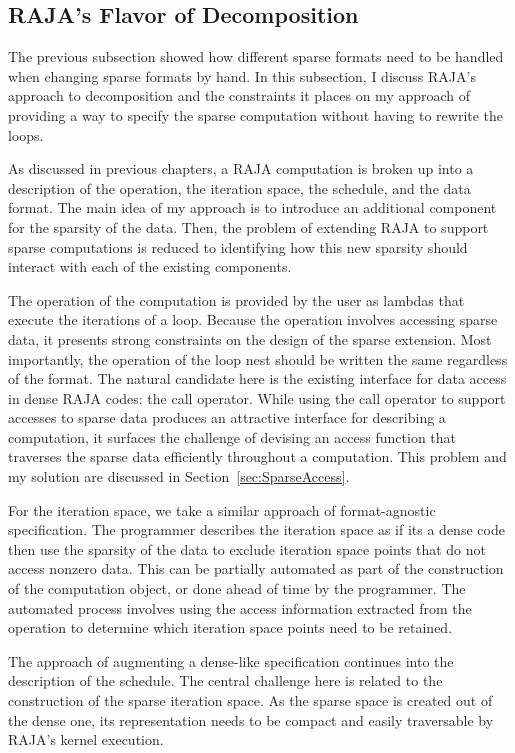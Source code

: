 \subsection{RAJA's Flavor of Decomposition}
The previous subsection showed how different sparse formats need to be handled when changing sparse formats by hand.  
In this subsection, I discuss RAJA's approach to decomposition and the constraints it places on my approach of providing a way to specify the sparse computation without having to rewrite the loops.

As discussed in previous chapters, a RAJA computation is broken up into a description of the operation, the iteration space, the schedule, and the data format.
The main idea of my approach is to introduce an additional component for the sparsity of the data.
Then, the problem of extending RAJA to support sparse computations is reduced to identifying how this new sparsity should interact with each of the existing components.

The operation of the computation is provided by the user as lambdas that execute the iterations of a loop. 
Because the operation involves accessing sparse data, it presents strong constraints on the design of the sparse extension. 
Most importantly, the operation of the loop nest should be written the same regardless of the format. 
The natural candidate here is the existing interface for data access in dense RAJA codes: the call operator. 
While using the call operator to support accesses to sparse data produces an attractive interface for describing a computation, it surfaces the challenge of devising an access function that traverses the sparse data efficiently throughout a computation. This problem and my solution are discussed in Section~\ref{sec:SparseAccess}.

For the iteration space, we take a similar approach of format-agnostic specification.
The programmer describes the iteration space as if its a dense code then use the sparsity of the data to exclude iteration space points that do not access nonzero data.
This can be partially automated as part of the construction of the computation object, or done ahead of time by the programmer.
The automated process involves using the access information extracted from the operation to determine which iteration space points need to be retained.

The approach of augmenting a dense-like specification continues into the description of the schedule. 
The central challenge here is related to the construction of the sparse iteration space. 
As the sparse space is created out of the dense one, its representation needs to be compact and easily traversable by RAJA's kernel execution. 

